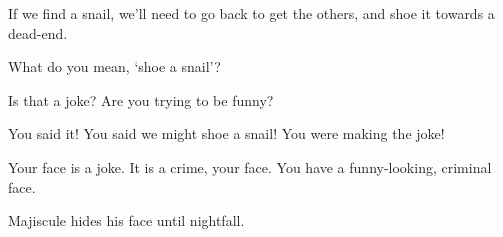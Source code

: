 \begin{speechtext}

  If we find a snail, we'll need to go back to get the others, and shoe it towards a dead-end.

  What do you mean, `shoe a snail'?

  Is that a joke?
  Are you trying to be funny?

  You said it!
  You said we might shoe a snail!
  You were making the joke!

  Your face is a joke.
  It is a crime, your face.
  You have a funny-looking, criminal face.

\end{speechtext}

Majiscule hides his face until nightfall.
